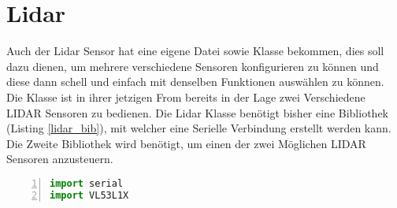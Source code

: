 \section{Lidar}
Auch der Lidar Sensor hat eine eigene Datei sowie Klasse bekommen, dies soll dazu dienen, um mehrere verschiedene Sensoren konfigurieren zu können und diese dann schell und einfach mit denselben Funktionen auswählen zu können.\\
Die Klasse ist in ihrer jetzigen From bereits in der Lage zwei Verschiedene \ac{LIDAR} Sensoren zu bedienen.
Die Lidar Klasse benötigt bisher eine Bibliothek (Listing \ref{lidar_bib}), mit welcher eine Serielle Verbindung erstellt werden kann. Die Zweite Bibliothek wird benötigt, um einen der zwei Möglichen \ac{LIDAR} Sensoren anzusteuern. 
\begin{lstlisting}[caption={Bibliotheken der Lidar Klasse}, language={Python}, label={lidar_bib}, numbers=left]
import serial
import VL53L1X
\end{lstlisting}

